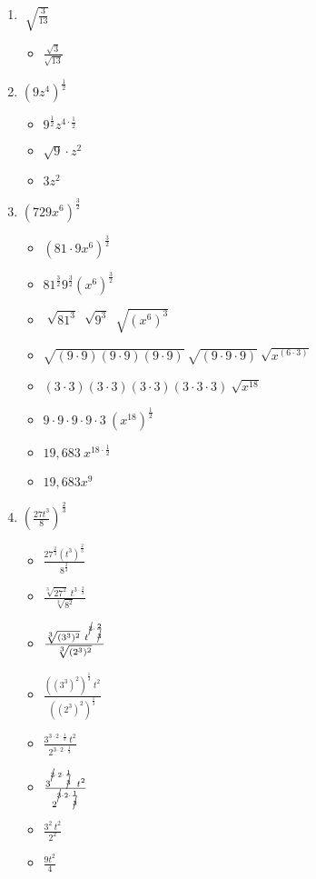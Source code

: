 \documentclass{article}
\begin{document}
\begin{onehalfspace}
\begin{enumerate}[start=29]
        \item $\sqrt[]{\frac{3}{13}}$
        \begin{itemize}
            \item $\frac{\sqrt{3}}{\sqrt{13}}$
        \end{itemize}

        \item $(9z^{4})^{\frac{1}{2}}$
        \begin{itemize}
            \item $9^{\frac{1}{2}}z^{4 \cdot \frac{1}{2}}$
            \item $\sqrt{9} \cdot z^{2}$
            \item $3 z^{2}$
        \end{itemize}

        \item $(729x^{6})^{\frac{3}{2}}$
        \begin{itemize}
            \item $(81 \cdot 9 x^{6})^{\frac{3}{2}}$
            \item $81^{\frac{3}{2}} 9^{\frac{3}{2}} (x^{6})^{\frac{3}{2}}$
            \item $\sqrt[]{81^{3}} \ \sqrt[]{9^{3}} \ \sqrt[]{(x^{6})^{3}}$
            \item $\sqrt{(9 \cdot 9)(9 \cdot 9)(9 \cdot 9)} \ \sqrt{(9 \cdot 9 \cdot 9)} \ \sqrt{x^{(6 \cdot 3)}}$
            \item $(3 \cdot 3)(3 \cdot 3)(3 \cdot 3)(3 \cdot 3 \cdot 3) \ \sqrt{x^{18}}$
            \item $9 \cdot 9 \cdot 9 \cdot 9 \cdot 3 \ (x^{18})^{\frac{1}{2}}$
            \item $19,683 \ x^{18 \cdot \frac{1}{2}}$
            \item $19,683 x^{9}$
        \end{itemize}

        \item $\left( \frac{27t^{3}}{8} \right)^{\frac{2}{3}}$
        \begin{itemize}
            \item $\frac{27^{\frac{2}{3}} (t^{3})^{\frac{2}{3}}}{8^{\frac{2}{3}}}$
            \item $\frac{\sqrt[3]{27^{2}} \ t^{3 \cdot \frac{2}{3}}}{\sqrt[3]{8^{2}}}$
            \item $\frac{\sqrt[3]{(3^{3})^{2}} \ t^{\cancel{3} \cdot \frac{2}{\cancel{3}}}}{\sqrt[3]{(2^{3})^{2}}}$
            \item $\frac{((3^{3})^{2})^{\frac{1}{3}} \ t^{2}}{((2^{3})^{2})^{\frac{1}{3}}}$
            \item $\frac{3^{3 \cdot 2 \cdot \frac{1}{3}} \ t^{2}}{2^{3 \cdot 2 \cdot \frac{1}{3}}}$
            \item $\frac{3^{\cancel{3} \cdot 2 \cdot \frac{1}{\cancel{3}}} \ t^{2}}{2^{\cancel{3} \cdot 2 \cdot \frac{1}{\cancel{3}}}}$
            \item $\frac{3^{2} \ t^{2}}{2^{2}}$
            \item $\frac{9 t^{2}}{4}$
        \end{itemize}


\end{enumerate}
\end{onehalfspace}
\end{document}
